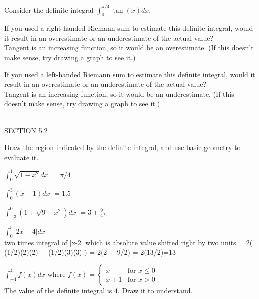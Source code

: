 \documentclass{exam}
\begin{document}
\begin{questions}
    \newpage\thispagestyle{empty}
\question Consider the definite integral $\displaystyle\int_0^{\pi/4} \tan(x)dx$.
  \begin{parts}
  \item If you used a right-handed Riemann sum to estimate this definite integral, would it result in an overestimate or an underestimate of the actual value? 
  \\ {\color{red} Tangent is an increasing function, so it would be an overestimate. (If this doesn't make sense, try drawing a graph to see it.)}
  \item If you used a left-handed Riemann sum to estimate this definite integral, would it result in an overestimate or an underestimate of the actual value? 
  \\ {\color{red} Tangent is an increasing function, so it would be an underestimate. (If this doesn't make sense, try drawing a graph to see it.)}
  \end{parts}
  


\ \\
\underline{SECTION 5.2}

\question Draw the region indicated by the definite integral, and use basic geometry to evaluate it.
  \begin{parts}
  \begin{multicols}{2}
  \item $\displaystyle\int_0^1 \sqrt{1-x^2}dx$ {\color{red} $=\pi/4$}
  \item $\displaystyle\int_0^3 (x-1)dx$  {\color{red} $=1.5$}
  \item $\displaystyle\int_{-3}^0\left( 1+\sqrt{9-x^2}\right)dx$ {\color{red} $=3+\frac{9}{4}\pi$}
    \item $\displaystyle\int_{0}^5 \left| 2x - 4 \right| dx$ 
  \\ {\color{red} two times integral of |x-2| which is absolute value shifted right by two units = 2( (1/2)(2)(2) + (1/2)(3)(3) ) = 2(2 + 9/2) = 2(13/2)=13}
  \item $\displaystyle\int_{-4}^4 f(x)dx$ where $f(x) = \left\{ \begin{array}{ll}x & \mbox{for $x\leq 0$}\\
  x+1& \mbox{for $x>0$}\end{array} \right.$ 
  \\ {\color{red} The value of the definite integral is $4$.  Draw it to understand.}
  \end{multicols}
  \end{parts}
  


\end{questions}
\end{document}
